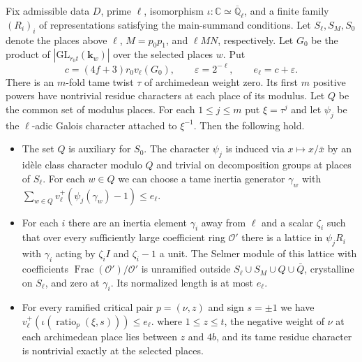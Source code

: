 \begin{lemma}
\label{lem:c-selmer-simultaneous-twist}
\emitthmsource
Fix admissible data $D$, prime $\ell$, isomorphism $\iota\colon\mathbb C\simeq\overline{\mathbb Q}_\ell$, and a finite family $(R_i)_i$ of representations satisfying the main-summand conditions. Let $S_\ell,S_M,S_0$ denote the places above $\ell$, $M=p_0p_1$, and $\ell MN$, respectively. Let $G_0$ be the product of $|\mathrm{GL}_{r_0t}(\mathbf k_w)|$ over the selected places $w$. Put
\[
 c=(4f+3)r_0v_\ell(G_0),\qquad
 \varepsilon=2^{-\ell},\qquad e_\ell=c+\varepsilon.
\]
There is an $m$-fold tame twist $\tau$ of archimedean weight zero. Its first $m$ positive powers have nontrivial residue characters at each place of its modulus. Let $Q$ be the common set of modulus places. For each $1\le j\le m$ put $\xi=\tau^j$ and let $\psi_j$ be the $\ell$-adic Galois character attached to $\xi^{-1}$. Then the following hold.

\begin{itemize}
\item The set $Q$ is auxiliary for $S_0$. The character $\psi_j$ is induced via $x\mapsto x/\bar x$ by an idèle class character modulo $Q$ and trivial on decomposition groups at places of $S_\ell$. For each $w\in Q$ we can choose a tame inertia generator $\gamma_w$ with
$\sum_{w\in Q}v_\ell^+(\psi_j(\gamma_w)-1)\le e_\ell$.
\item For each $i$ there are an inertia element $\gamma_i$ away from $\ell$ and a scalar $\zeta_i$ such that over every sufficiently large coefficient ring $\mathcal O'$ there is a lattice in $\psi_jR_i$ with $\gamma_i$ acting by $\zeta_i I$ and $\zeta_i-1$ a unit. The Selmer module of this lattice with coefficients $\operatorname{Frac}(\mathcal O')/\mathcal O'$ is unramified outside $S_\ell\cup S_M\cup Q\cup\bar Q$, crystalline on $S_\ell$, and zero at $\gamma_i$. Its normalized length is at most $e_\ell$.
\item For every ramified critical pair $p=(\nu,z)$ and sign $s=\pm1$ we have
$v_\ell^+(\iota(\operatorname{ratio}_p(\xi,s)))\le e_\ell$.
where $1\le z\le t$, the negative weight of $\nu$ at each archimedean place lies between $z$ and $4b$, and its tame residue character is nontrivial exactly at the selected places.
\end{itemize}
\end{lemma}

